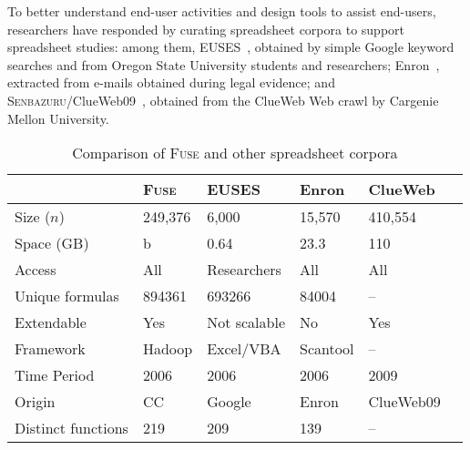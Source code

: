 \documentclass[conference]{IEEEtran}
\begin{document}
To better understand end-user activities and design tools to assist end-users, researchers have responded by curating spreadsheet corpora to support spreadsheet studies: among them, EUSES~\cite{Fisher2005}, obtained by simple Google keyword searches and from Oregon State University students and researchers; Enron~\cite{Felienne2015}, extracted from e-mails obtained during legal evidence; and \textsc{Senbazuru}/ClueWeb09~\cite{Chen2013}, obtained from the ClueWeb Web crawl by Cargenie Mellon University.

\begin{table}[!t]
\caption{Comparison of \textsc{Fuse} and other spreadsheet corpora\label{tab:corpora}}
\centering
\begin{tabular}{llllll}
\toprule
 & \textbf{\textsc{Fuse}} & \textbf{EUSES} & \textbf{Enron} & \textbf{ClueWeb}\\
\midrule
Size ($n$) & 249,376 & 6,000 & 15,570 & 410,554\\
Space (GB) & b & 0.64 & 23.3 & 110\\
Access & All & Researchers & All & All\\
Unique formulas & 894361 & 693266 & 84004 & --\\
Extendable & Yes & Not scalable & No & Yes\\
Framework & Hadoop & Excel/VBA & Scantool & \textsc{--}\\
Time Period & 2006 & 2006 & 2006 & 2009\\
Origin & CC & Google & Enron & ClueWeb09\\
Distinct functions & 219 & 209 & 139 & --\\
\bottomrule
\end{tabular}
\end{table}
\end{document}
